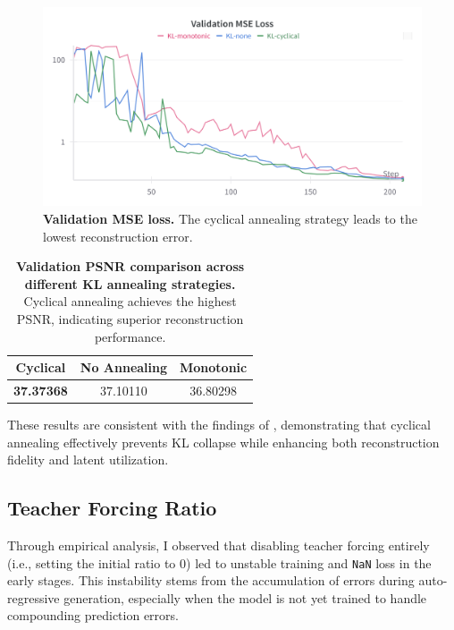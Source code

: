 \documentclass[twocolumn,a4paper]{article}
\begin{document}
\begin{figure}[H]
\centering
\includegraphics[width=0.95\linewidth]{figures/val_kl_mse}
\caption{\textbf{Validation MSE loss.} The cyclical annealing strategy leads to the lowest reconstruction error.}
\label{fig:valklmse}
\end{figure}

\begin{table}[H]
\centering
\caption{\textbf{Validation PSNR comparison across different KL annealing strategies.} Cyclical annealing achieves the highest PSNR, indicating superior reconstruction performance.}
\begin{tabular}{ccc}
\toprule
\textbf{Cyclical} & \textbf{No Annealing} & \textbf{Monotonic} \\
\midrule
\textbf{37.37368} & 37.10110 & 36.80298 \\
\bottomrule
\end{tabular}
\label{tab:psnr_kl_annealing}
\end{table}

These results are consistent with the findings of \cite{fu2019cyclical}, demonstrating that cyclical annealing effectively prevents KL collapse while enhancing both reconstruction fidelity and latent utilization.

\subsection{Teacher Forcing Ratio}

Through empirical analysis, I observed that disabling teacher forcing entirely (i.e., setting the initial ratio to 0) led to unstable training and \texttt{NaN} loss in the early stages. This instability stems from the accumulation of errors during auto-regressive generation, especially when the model is not yet trained to handle compounding prediction errors.
\end{document}

